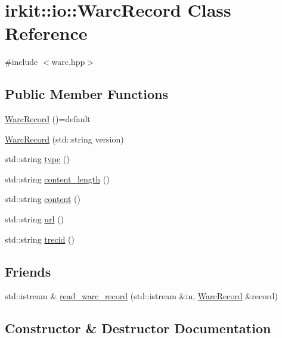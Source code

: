 \hypertarget{classirkit_1_1io_1_1WarcRecord}{}\section{irkit\+:\+:io\+:\+:Warc\+Record Class Reference}
\label{classirkit_1_1io_1_1WarcRecord}


{\ttfamily \#include $<$warc.\+hpp$>$}

\subsection*{Public Member Functions}
\begin{DoxyCompactItemize}
\item 
\mbox{\hyperlink{classirkit_1_1io_1_1WarcRecord_a45c192e8025af47cf9647990c3e86e2a}{Warc\+Record}} ()=default
\item 
\mbox{\hyperlink{classirkit_1_1io_1_1WarcRecord_a49833fb1203d92265bc9865309e1fe00}{Warc\+Record}} (std\+::string version)
\item 
std\+::string \mbox{\hyperlink{classirkit_1_1io_1_1WarcRecord_ae45bc7b363d573ec3e7f5df1c1c66d8c}{type}} ()
\item 
std\+::string \mbox{\hyperlink{classirkit_1_1io_1_1WarcRecord_afd8bb63c238f5d79f116159b2dec3b2e}{content\+\_\+length}} ()
\item 
std\+::string \mbox{\hyperlink{classirkit_1_1io_1_1WarcRecord_a4d75aa66b5de6462770541b6b027924d}{content}} ()
\item 
std\+::string \mbox{\hyperlink{classirkit_1_1io_1_1WarcRecord_a7d35908f4e778d1f453ced390cc41d23}{url}} ()
\item 
std\+::string \mbox{\hyperlink{classirkit_1_1io_1_1WarcRecord_a64f01484d0ccc44277248cea943b774a}{trecid}} ()
\end{DoxyCompactItemize}
\subsection*{Friends}
\begin{DoxyCompactItemize}
\item 
std\+::istream \& \mbox{\hyperlink{classirkit_1_1io_1_1WarcRecord_aadc413d200017bd8aa5b5236a1158cfd}{read\+\_\+warc\+\_\+record}} (std\+::istream \&in, \mbox{\hyperlink{classirkit_1_1io_1_1WarcRecord}{Warc\+Record}} \&record)
\end{DoxyCompactItemize}


\subsection{Constructor \& Destructor Documentation}
\mbox{\label{classirkit_1_1io_1_1WarcRecord_a45c192e8025af47cf9647990c3e86e2a}} 

